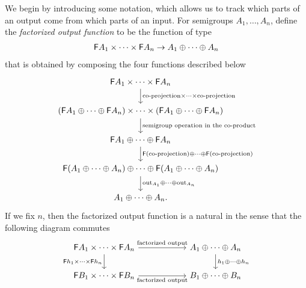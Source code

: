 We begin by introducing some notation, which allows us to track which parts of an output come from which parts of an input.
For semigroups $A_1,\ldots,A_n$, define the \emph{factorized output function} to be the 
function of type 
\begin{align*}
\mathsf F A_1 \times \cdots \times \mathsf F A_n \to A_1 \oplus \cdots \oplus A_n
\end{align*}
that is obtained by composing the  four functions described below
\[
\begin{tikzcd}
\functor A_1 \times \cdots \times \functor A_n
\ar[d,"\text{co-projection} \times \cdots \times \text{co-projection}"]
\\
(\functor A_1 \oplus \cdots \oplus \functor A_n)
\times
\cdots
\times 
(\functor A_1 \oplus \cdots \oplus \functor A_n)
\ar[d,"\text{semigroup operation in the co-product}"]
\\
\functor A_1 \oplus \cdots \oplus \functor A_n
\ar[d, "\functor (\text{co-projection}) \oplus \cdots \oplus \functor (\text{co-projection}) "]\\
\functor (A_1 \oplus \cdots \oplus A_n) \oplus \cdots \oplus \functor (A_1 \oplus \cdots \oplus A_n)
\ar[d, "\outfun_{A_1} \oplus \cdots \oplus \outfun_{A_n}"]\\ 
A_1 \oplus \cdots \oplus A_n.
\end{tikzcd}
\]
If we fix $n$, then the factorized output function is a natural in the sense that the following diagram commutes 
\[
\begin{tikzcd}
    [column sep=2cm]
\functor A_1 \times \cdots \times \functor A_n
\ar[r,"\text{factorized output}"]
\ar[d,"\functor h_1 \times \cdots \times \functor h_n"']
&
A_1 \oplus \cdots \oplus A_n
\ar[d,"h_1 \oplus \cdots \oplus h_n"]
\\
\functor B_1 \times \cdots \times \functor B_n
\ar[r,"\text{factorized output}"']
&
B_1 \oplus \cdots \oplus B_n
\end{tikzcd}
\]
